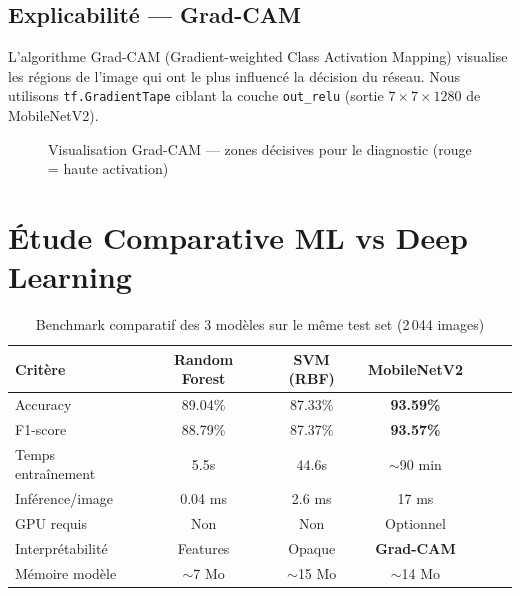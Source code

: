 \documentclass[12pt,a4paper]{article}
\begin{document}
\subsection{Explicabilité — Grad-CAM}

L'algorithme Grad-CAM (Gradient-weighted Class Activation Mapping) visualise 
les régions de l'image qui ont le plus influencé la décision du réseau. 
Nous utilisons \texttt{tf.GradientTape} ciblant la couche \texttt{out\_relu} 
(sortie $7\times7\times1280$ de MobileNetV2).

\begin{figure}[H]
\centering
{}
\caption{Visualisation Grad-CAM — zones décisives pour le diagnostic (rouge = haute activation)}
\end{figure}

\section{Étude Comparative ML vs Deep Learning}

\begin{table}[H]
\centering\small
\begin{tabular}{lcccccc}
\toprule
\textbf{Critère} & \textbf{Random Forest} & \textbf{SVM (RBF)} & \textbf{MobileNetV2} \\
\midrule
Accuracy          & 89.04\%   & 87.33\%   & \textbf{93.59\%} \\
F1-score          & 88.79\%   & 87.37\%   & \textbf{93.57\%} \\
Temps entraînement & 5.5s    & 44.6s     & $\sim$90 min \\
Inférence/image   & 0.04 ms  & 2.6 ms    & 17 ms \\
GPU requis        & Non       & Non       & Optionnel \\
Interprétabilité  & Features  & Opaque    & \textbf{Grad-CAM} \\
Mémoire modèle    & $\sim$7 Mo & $\sim$15 Mo & $\sim$14 Mo \\
\bottomrule
\end{tabular}
\caption{Benchmark comparatif des 3 modèles sur le même test set (2\,044 images)}
\end{table}
\end{document}
